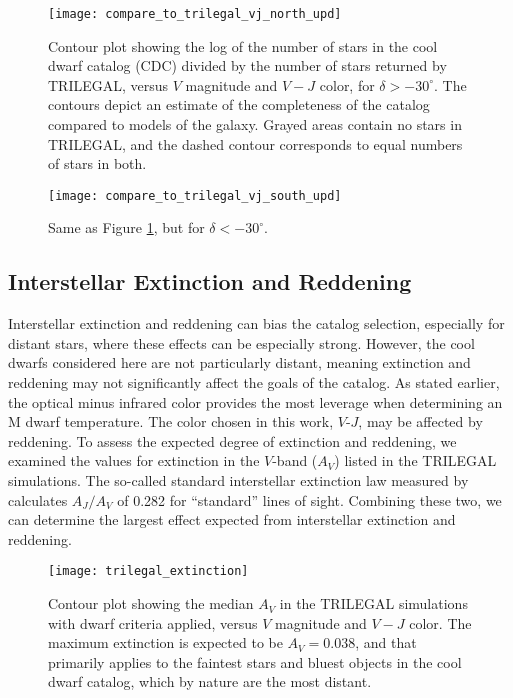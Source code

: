 \documentclass[twocolumn]{aastex62}
\begin{document}
\begin{figure}
    \centering
    \texttt{[image: compare\_to\_trilegal\_vj\_north\_upd]}
    \caption{Contour plot showing the log of the number of stars in the cool dwarf catalog (CDC) divided by the number of stars returned by TRILEGAL, versus $V$ magnitude and $V-J$ color, for $\delta>-30^\circ$.  The contours depict an estimate of the completeness of the catalog compared to models of the galaxy.  Grayed areas contain no stars in TRILEGAL, and the dashed contour corresponds to equal numbers of stars in both.}
    \label{compare_to_trilegal_vj_north}
\end{figure}

\begin{figure}
    \centering
    \texttt{[image: compare\_to\_trilegal\_vj\_south\_upd]}
    \caption{Same as Figure \ref{compare_to_trilegal_vj_north}, but for $\delta<-30^\circ$.}
    \label{compare_to_trilegal_vj_south}
\end{figure}


\subsection{Interstellar Extinction and Reddening}

Interstellar extinction and reddening can bias the catalog selection, especially for distant stars, where these effects can be especially strong.  However, the cool dwarfs considered here are not particularly distant, meaning extinction and reddening may not significantly affect the goals of the catalog.  As stated earlier, the optical minus infrared color provides the most leverage when determining an M dwarf temperature.  The color chosen in this work, $V$-$J$, may be affected by reddening. To assess the expected degree of extinction and reddening, we examined the values for extinction in the $V$-band ($A_V$) listed in the TRILEGAL simulations.  The so-called standard interstellar extinction law measured by \citet{Rieke1985} calculates $A_J/A_V$ of 0.282 for ``standard'' lines of sight.  Combining these two, we can determine the largest effect expected from interstellar extinction and reddening.

\begin{figure}
    \centering
    \texttt{[image: trilegal\_extinction]}
    \caption{Contour plot showing the median $A_V$ in the TRILEGAL simulations with dwarf criteria applied, versus $V$ magnitude and $V-J$ color.  The maximum extinction is expected to be $A_V=0.038$, and that primarily applies to the faintest stars and bluest objects in the cool dwarf catalog, which by nature are the most distant.}
    \label{trilegal_extinction}
\end{figure}
\end{document}
